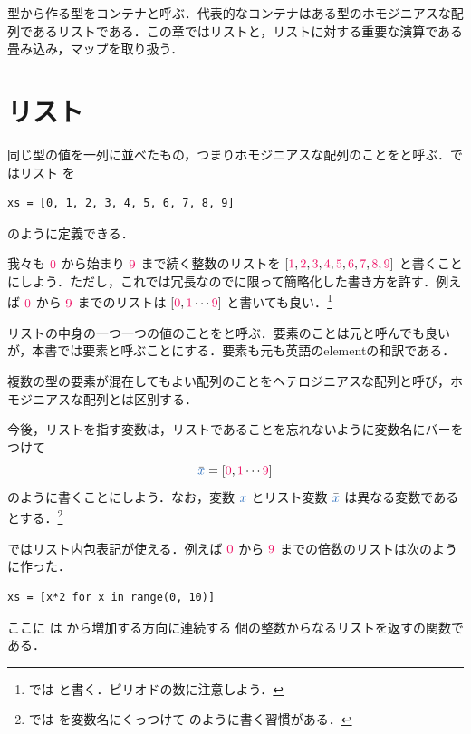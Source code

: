 \documentclass[a5paper,twoside,fleqn,draft]{jsbook}
\begin{document}
\begin{leader}
型から作る型をコンテナと呼ぶ．代表的なコンテナはある型のホモジニアスな配列であるリストである．この章ではリストと，リストに対する重要な演算である畳み込み，マップを取り扱う．
\end{leader}

\section{リスト}

同じ型の値を一列に並べたもの，つまりホモジニアスな配列のことをと呼ぶ．\python ではリスト  を
\begin{pythoncode}
\begin{verbatim}
xs = [0, 1, 2, 3, 4, 5, 6, 7, 8, 9]
\end{verbatim}
\end{pythoncode}
のように定義できる．

我々も $\hConstant{0}$ から始まり $\hConstant{9}$ まで続く整数のリストを $[\hConstant{1},\hConstant{2},\hConstant{3},\hConstant{4},\hConstant{5},\hConstant{6},\hConstant{7},\hConstant{8},\hConstant{9}]$ と書くことにしよう．ただし，これでは冗長なのでに限って簡略化した書き方を許す．例えば $\hConstant{0}$ から $\hConstant{9}$ までのリストは $[\hConstant{0},\hConstant{1}\dotsb\hConstant{9}]$ と書いても良い．\footnote{\haskell では \code{[0, 1..9]} と書く．ピリオドの数に注意しよう．}

リストの中身の一つ一つの値のことをと呼ぶ．要素のことは元と呼んでも良いが，本書では要素と呼ぶことにする．要素も元も英語のelementの和訳である．

複数の型の要素が混在してもよい配列のことをヘテロジニアスな配列と呼び，ホモジニアスな配列とは区別する．

今後，リストを指す変数は，リストであることを忘れないように変数名にバーをつけて
\begin{equation}
  \hListVarWith{x}
  =\hListWith{\hConstant{0},\hConstant{1}\dotsb\hConstant{9}}
\end{equation}
のように書くことにしよう．なお，変数 $\hVar{x}$ とリスト変数 $\hListVarWith{x}$ は異なる変数であるとする．\footnote{\haskell では  を変数名にくっつけて  のように書く習慣がある．}

\separator

\python ではリスト内包表記が使える．例えば $\hConstant{0}$ から $\hConstant{9}$ までの倍数のリストは次のように作った．
\begin{pythoncode}
\begin{verbatim}
xs = [x*2 for x in range(0, 10)]
\end{verbatim}
\end{pythoncode}
ここに  は  から増加する方向に連続する  個の整数からなるリストを返す\python の関数である．
\end{document}
